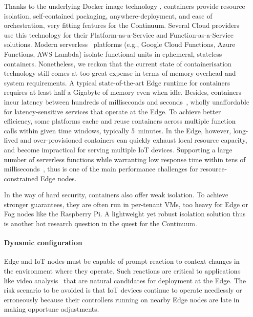 Thanks to the underlying Docker image technology \cite{docker-image}, containers provide resource isolation, self-contained packaging, anywhere-deployment, and ease of orchestration, very fitting features for the Continuum.
Several Cloud providers use this technology for their Platform-as-a-Service and Function-as-a-Service solutions. Modern serverless~\cite{jonas2019Cloud} platforms (e.g., Google Cloud Functions, Azure Functions, AWS Lambda) isolate functional units in ephemeral, stateless containers. 
Nonetheless, we reckon that the current state of containerisation technology still comes at too great expense in terms of memory overhead and system requirements. A typical state-of-the-art Edge runtime for containers requires at least half a Gigabyte of memory even when idle.
Besides, containers incur latency between hundreds of milliseconds and seconds~\cite{mohanty2018evaluation}, wholly unaffordable for latency-sensitive services that operate at the Edge. 
To achieve better efficiency, some platforms cache and reuse containers across multiple function calls within given time windows, typically 5~minutes. 
In the Edge, however, long-lived and over-provisioned containers can quickly exhaust local resource capacity, and become impractical for serving multiple IoT devices. 
Supporting a large number of serverless functions while warranting low response time within tens of milliseconds~\cite{elbamby2019wireless}, thus is one of the main performance challenges for resource-constrained Edge nodes.

In the way of hard security, containers also offer weak isolation. To achieve stronger guarantees, they are often run in per-tenant VMs, too heavy for Edge or Fog nodes like the Raspberry Pi. 
A light\-weight yet robust isolation solution thus is another hot research question in the quest for the Continuum.

\paragraph{Dynamic configuration}

Edge and IoT nodes must be capable of prompt reaction to context changes in the environment where they operate. 
Such reactions are critical to applications like video analysis~\cite{jang2018application} that are natural candidates for deployment at the Edge. 
The risk scenario to be avoided is that IoT devices continue to operate needlessly or erroneously because their controllers running on nearby Edge nodes are late in making opportune adjustments.

